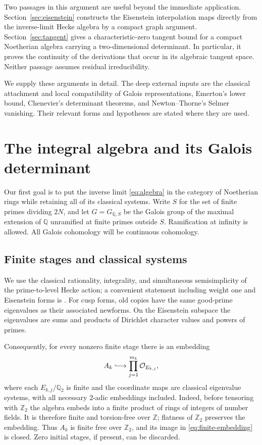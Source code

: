 \documentclass[11pt]{article}
\theoremstyle{remark}
\numberwithin{equation}{section}
\newcommand{\Z}{\mathbb Z}
\newcommand{\Q}{\mathbb Q}
\newcommand{\OO}{\mathcal O}
\begin{document}
Two passages in this argument are useful beyond the immediate
application. Section~\ref{sec:eisenstein} constructs the Eisenstein
interpolation maps directly from the inverse-limit Hecke algebra by a
compact graph argument. Section~\ref{sec:tangent} gives a
characteristic-zero tangent bound for a compact Noetherian algebra
carrying a two-dimensional determinant. In particular, it proves the
continuity of the derivations that occur in its algebraic tangent
space. Neither passage assumes residual irreducibility.

We supply these arguments in detail. The deep external inputs are
the classical attachment and local compatibility of Galois
representations, Emerton's lower bound, Chenevier's determinant
theorems, and Newton--Thorne's Selmer vanishing. Their relevant
forms and hypotheses are stated where they are used.

\section{The integral algebra and its Galois determinant}
\label{sec:integral}

Our first goal is to put the inverse limit \eqref{eq:algebra} in the
category of Noetherian rings while retaining all of its classical
systems. Write $S$ for the set of finite primes dividing $2N$, and
let $G=G_{\Q,S}$ be the Galois group of the maximal extension of $\Q$
unramified at finite primes outside $S$. Ramification at infinity is
allowed. All Galois cohomology will be continuous cohomology.

\subsection{Finite stages and classical systems}
We use the classical rationality, integrality, and simultaneous
semisimplicity of the prime-to-level Hecke action; a convenient
statement including weight one and Eisenstein forms is
\cite[Proposition~1.12 and Remark~1.13]{Emerton11}. For cusp forms,
old copies have the same good-prime eigenvalues as their associated
newforms. On the Eisenstein subspace the eigenvalues are sums and
products of Dirichlet character values and powers of primes.

Consequently, for every nonzero finite stage there is an embedding
\begin{equation}\label{eq:finite-embedding}
 A_k\lhook\joinrel\longrightarrow
 \prod_{j=1}^{m_k}\OO_{E_{k,j}},
\end{equation}
where each $E_{k,j}/\Q_2$ is finite and the coordinate maps are
classical eigenvalue systems, with all necessary $2$-adic embeddings
included. Indeed, before tensoring with $\Z_2$ the algebra embeds
into a finite product of rings of integers of number fields. It is
therefore finite and torsion-free over $\Z$; flatness of $\Z_2$
preserves the embedding. Thus $A_k$ is finite free over $\Z_2$, and
its image in \eqref{eq:finite-embedding} is closed. Zero initial
stages, if present, can be discarded.
\end{document}
